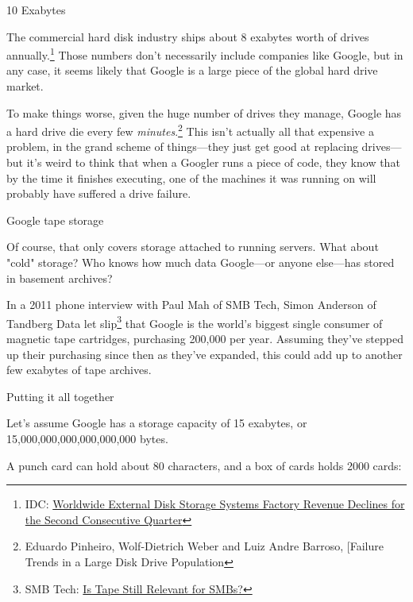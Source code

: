 {{10 Exabytes}

{The commercial hard disk industry ships about 8 exabytes worth of drives annually.{\footnote{IDC: \href{http://www.idc.com/getdoc.jsp?containerId=prUS24302513}{Worldwide External Disk Storage Systems Factory Revenue Declines for the Second Consecutive Quarter}} } Those numbers don't necessarily include companies like Google, but in any case, it seems likely that Google is a large piece of the global hard drive market.}

{To make things worse, given the huge number of drives they manage, Google has a hard drive die every few \emph{minutes}.{\footnote{Eduardo Pinheiro, Wolf-Dietrich Weber and Luiz Andre Barroso, [Failure Trends in a Large Disk Drive Population} } This isn't actually all that expensive a problem, in the grand scheme of things—they just get good at replacing drives—but it's weird to think that when a Googler runs a piece of code, they know that by the time it finishes executing, one of the machines it was running on will probably have suffered a drive failure.}

{Google tape storage}

{Of course, that only covers storage attached to running servers. What about "cold" storage? Who knows how much data Google—or anyone else—has stored in basement archives?}

{In a 2011 phone interview with Paul Mah of SMB Tech, Simon Anderson of Tandberg Data let slip{\footnote{SMB Tech: \href{http://www.itbusinessedge.com/cm/blogs/mah/is-tape-still-relevant-for-smbs/?cs=45557}{Is Tape Still Relevant for SMBs?}} } that Google is the world's biggest single consumer of magnetic tape cartridges, purchasing 200,000 per year. Assuming they've stepped up their purchasing since then as they've expanded, this could add up to another few exabytes of tape archives.}

{Putting it all together}

{Let's assume Google has a storage capacity of 15 exabytes, or 15,000,000,000,000,000,000 bytes.}

{A punch card can hold about 80 characters, and a box of cards holds 2000 cards:}

}
